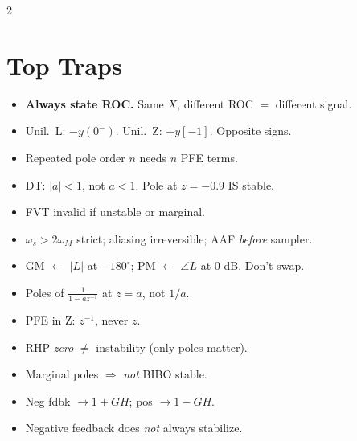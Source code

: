 \documentclass[11pt,landscape]{extarticle}
\begin{document}
\begin{paracol}{2}
\section*{Top Traps}
\begin{itemize}
\item \textbf{Always state ROC.} Same $X$, different ROC $=$ different signal.
\item Unil.\ L: $\mathbf{-}y(0^-)$. Unil.\ Z: $\mathbf{+}y[-1]$. Opposite signs.
\item Repeated pole order $n$ needs $n$ PFE terms.
\item DT: $|a|{<}1$, not $a{<}1$. Pole at $z{=}{-}0.9$ IS stable.
\item FVT invalid if unstable or marginal.
\item $\omega_s{>}2\omega_M$ strict; aliasing irreversible; AAF \emph{before} sampler.
\item GM $\leftarrow$ $|L|$ at $-180^\circ$; PM $\leftarrow$ $\angle L$ at 0 dB. Don't swap.
\item Poles of $\tfrac{1}{1-az^{-1}}$ at $z{=}a$, not $1/a$.
\item PFE in Z: $z^{-1}$, never $z$.
\item RHP \emph{zero} $\ne$ instability (only poles matter).
\item Marginal poles $\Rightarrow$ \emph{not} BIBO stable.
\item Neg fdbk $\to 1{+}GH$; pos $\to 1{-}GH$.
\item Negative feedback does \emph{not} always stabilize.
\end{itemize}

\switchcolumn*

\end{paracol}
\end{document}
